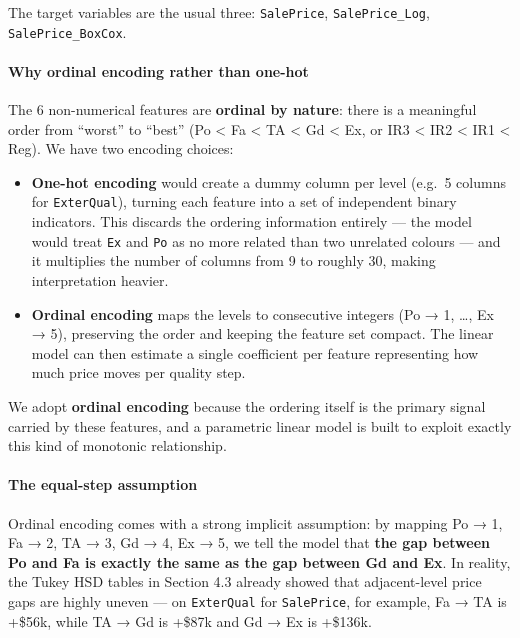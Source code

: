 The target variables are the usual three: \texttt{SalePrice},
\texttt{SalePrice\_Log}, \texttt{SalePrice\_BoxCox}.

\paragraph{Why ordinal encoding rather than
one-hot}\label{why-ordinal-encoding-rather-than-one-hot}

The 6 non-numerical features are \textbf{ordinal by nature}: there is a
meaningful order from ``worst'' to ``best'' (Po \textless{} Fa
\textless{} TA \textless{} Gd \textless{} Ex, or IR3 \textless{} IR2
\textless{} IR1 \textless{} Reg). We have two encoding choices:

\begin{itemize}
\tightlist
\item
  \textbf{One-hot encoding} would create a dummy column per level
  (e.g.~5 columns for \texttt{ExterQual}), turning each feature into a
  set of independent binary indicators. This discards the ordering
  information entirely --- the model would treat \texttt{Ex} and
  \texttt{Po} as no more related than two unrelated colours --- and it
  multiplies the number of columns from 9 to roughly 30, making
  interpretation heavier.
\item
  \textbf{Ordinal encoding} maps the levels to consecutive integers (Po
  → 1, \ldots, Ex → 5), preserving the order and keeping the feature set
  compact. The linear model can then estimate a single coefficient per
  feature representing how much price moves per quality step.
\end{itemize}

We adopt \textbf{ordinal encoding} because the ordering itself is the
primary signal carried by these features, and a parametric linear model
is built to exploit exactly this kind of monotonic relationship.

\paragraph{The equal-step assumption}\label{the-equal-step-assumption}

Ordinal encoding comes with a strong implicit assumption: by mapping Po
→ 1, Fa → 2, TA → 3, Gd → 4, Ex → 5, we tell the model that \textbf{the
gap between Po and Fa is exactly the same as the gap between Gd and Ex}.
In reality, the Tukey HSD tables in Section 4.3 already showed that
adjacent-level price gaps are highly uneven --- on \texttt{ExterQual}
for \texttt{SalePrice}, for example, Fa → TA is +\$56k, while TA → Gd is
+\$87k and Gd → Ex is +\$136k.

